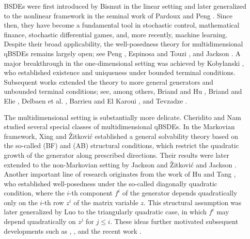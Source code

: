 \documentclass[10pt,a4paper]{article}
\theoremstyle{plain}
\theoremstyle{definition}
\numberwithin{equation}{section}
\begin{document}
BSDEs were first introduced by Bismut \cite{Bis73} in the linear setting and later generalized to the nonlinear framework in the seminal work of Pardoux and Peng \cite{PP90}. Since then, they have become a fundamental tool in stochastic control, mathematical finance, stochastic differential games, and, more recently, machine learning. Despite their broad applicability, the well-posedness theory for multidimensional qBSDEs remains largely open; see Peng \cite{Peng1999}, Espinosa and Touzi \cite{ET2015}, and Jackson \cite{Jack23}. A major breakthrough in the one-dimensional setting was achieved by Kobylanski \cite{koby00}, who established existence and uniqueness under bounded terminal conditions. Subsequent works extended the theory to more general generators and unbounded terminal conditions; see, among others, Briand and Hu \cite{BriandHu2006PTRF,BriandHu2008PTRF}, Briand and Elie \cite{BriandElie2013SPA}, Delbaen et al. \cite{DelbaenHuRichou2011AIHPPS,DelbaenHuRichou2015DCD}, Barrieu and El Karoui \cite{BarrieuElKaroui2013AoP}, and Tevzadze \cite{Tev08}. 

The multidimensional setting is substantially more delicate. Cheridito and Nam \cite{cheridito2015Stochastics} studied several special classes of multidimensional qBSDEs. In the Markovian framework, Xing and \v{Z}itkovi\'{c} \cite{XZ18} established a general solvability theory based on the so-called (BF) and (AB) structural conditions, which restrict the quadratic growth of the generator along prescribed directions. Their results were later extended to the non-Markovian setting by Jackson and \v{Z}itkovi\'{c} \cite{JZ22} and Jackson \cite{Jack23}. Another important line of research originates from the work of Hu and Tang \cite{HT16}, who established well-posedness under the so-called diagonally quadratic condition, where the \(i\)-th component \(f^i\) of the generator depends quadratically only on the \(i\)-th row \(z^i\) of the matrix variable \(z\). This structural assumption was later generalized by Luo \cite{luo20} to the triangularly quadratic case, in which \(f^i\) may depend quadratically on \(z^j\) for \(j \le i\). These ideas further motivated subsequent developments such as \cite{JZ22}, \cite{FanHuTang2023JDE}, and the recent work \cite{FHT25}.
\end{document}
